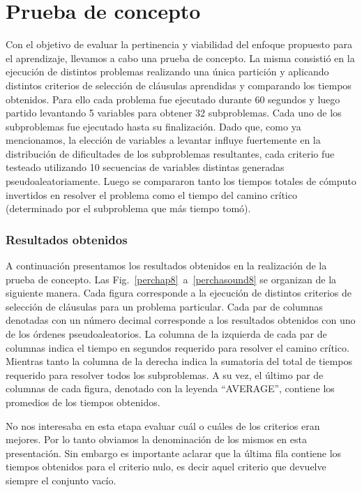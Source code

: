 

\section{Prueba de concepto}

Con el objetivo de evaluar la pertinencia y viabilidad del enfoque propuesto
para el aprendizaje, llevamos a cabo una prueba de concepto. La misma
consistió en la ejecución de distintos problemas realizando una única
partición y aplicando distintos criterios de selección de cláusulas aprendidas
y comparando los tiempos obtenidos. Para ello cada problema fue ejecutado
durante 60 segundos y luego partido levantando 5 variables para obtener 32
subproblemas. Cada uno de los subproblemas fue ejecutado hasta su
finalización. Dado que, como ya mencionamos, la elección de variables a
levantar influye fuertemente en la distribución de dificultades de los
subproblemas resultantes, cada criterio fue testeado utilizando 10 secuencias
de variables distintas generadas pseudoaleatoriamente. Luego se compararon
tanto los tiempos totales de cómputo invertidos en resolver el problema como
el tiempo del camino crítico (determinado por el subproblema que más tiempo
tomó).


\subsubsection{Resultados obtenidos}

A continuación presentamos los resultados obtenidos en la realización de la
prueba de concepto. Las Fig.~\ref{perchap8}~a~\ref{perchasound8}  se organizan
de la siguiente manera. Cada figura corresponde a la ejecución de distintos
criterios de selección de cláusulas para un problema particular. Cada par de
columnas denotadas con un número decimal corresponde a los resultados
obtenidos con uno de los órdenes pseudoaleatorios. La columna de la izquierda
de cada par de columnas indica el tiempo en segundos requerido para resolver
el camino crítico. Mientras tanto la columna de la derecha indica la sumatoria
del total de tiempos requerido para resolver todos los subproblemas. A su vez,
el último par de columnas de cada figura, denotado con la leyenda ``AVERAGE'',
contiene los promedios de los tiempos obtenidos.

No nos interesaba en esta etapa evaluar cuál o cuáles de los criterios eran
mejores. Por lo tanto obviamos la denominación de los mismos en esta
presentación. Sin embargo es importante aclarar que la última fila contiene
los tiempos obtenidos para el criterio nulo, es decir aquel criterio que
devuelve siempre el conjunto vacío.

